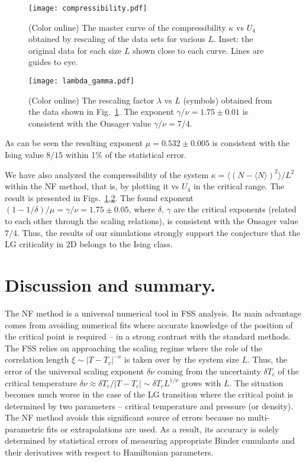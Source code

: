 \documentclass[prb,aps,twocolumn,groupedaddress,floats,showpacs,final]{revtex4}
\begin{document}
\begin{figure}
 \texttt{[image: compressibility.pdf]}
\caption{(Color online) 
The master curve of the compressibility $\kappa$ vs $U_4$ obtained by rescaling of the data sets for various $L$. Inset: the original data for each size $L$ shown close to each curve. Lines are guides to eye.}
\label{fig:kappa}
\end{figure}
 \begin{figure}
 \texttt{[image: lambda\_gamma.pdf]}
\caption{(Color online) The rescaling factor $\lambda$ vs $L$ (symbols) obtained from the data shown in Fig.~\ref{fig:kappa}. The exponent $\gamma/\nu =1.75 \pm 0.01$ is consistent with the Onsager value $\gamma/\nu=7/4$. }
\label{fig:lam_k}
\end{figure}  
  As can be seen the resulting exponent $\mu=0.532 \pm 0.005 $ is consistent with the Ising value $8/15$ within 1\% of the statistical error. 

We have also analyzed the compressibility of the system $\kappa= \langle (N-\langle N\rangle)^2\rangle/L^2$ within the NF  method, that is, by plotting it vs $U_4$ in the critical range. The result is presented in Figs.~\ref{fig:kappa},\ref{fig:lam_k}.  
The found exponent $(1-1/\delta)/\mu=\gamma/\nu =1.75 \pm 0.05$, where $\delta,\, \gamma$ are the critical exponents (related to each other through the scaling relations),
is consistent with the Onsager value $7/4$. 
Thus, the results of our simulations strongly support the conjecture that the LG criticality in 2D belongs to the Ising class.


\section{Discussion and summary.}\label{sec:dis}
The NF method \cite{Annals,NJP} is a universal numerical tool in FSS analysis. Its main advantage comes from avoiding numerical fits where accurate knowledge of the position of the critical point is required -- in a strong contrast with the standard methods.  
The FSS relies on approaching the scaling regime where the role of the correlation length $\xi \sim |T-T_c|^{-\nu}$ is taken over by the system size $L$. Thus, the error of the universal scaling exponent $\delta \nu$ coming from the uncertainty $\delta T_c$ of the critical temperature $\delta \nu \approx \delta T_c/|T-T_c|\sim \delta T_c L^{1/\nu}$  grows with $L$. The situation becomes much worse in the case of the LG transition where the critical point is determined by two parameters -- critical temperature and pressure (or density). The NF method avoids this significant source of errors because no multi-parametric fits or extrapolations are used. As a result, its accuracy is solely determined by statistical errors of measuring appropriate Binder cumulants and their derivatives with respect to Hamiltonian parameters. 
\end{document}
